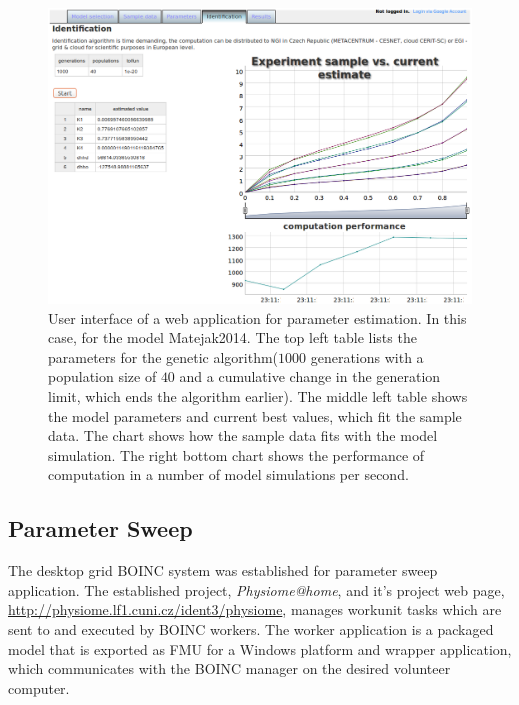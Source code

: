 \begin{figure}[htb]
    \centering
    \includegraphics[width=1\textwidth]{chapter7/app-physiovalues.png}
    \caption{User interface of a web application for parameter estimation. In this case, for the model Matejak2014\cite{Matejak2014sj}. The top left table lists the parameters for the genetic algorithm($\num{1000}$ generations with a population size of $40$ and a cumulative change in the generation limit, which ends the algorithm earlier). The middle left table shows the model parameters and current best values, which fit the sample data. The chart shows how the sample data fits with the model simulation. The right bottom chart shows the performance of computation in a number of model simulations per second.}
    \label{fig:app.physiovalues}
\end{figure}

\subsection{Parameter Sweep}
\label{sec:resultsboinc}
The desktop grid BOINC system was established for parameter sweep application. The established project, \emph{Physiome@home}, and it's project web page, \url{http://physiome.lf1.cuni.cz/ident3/physiome}, manages workunit tasks which are sent to and executed by BOINC workers. The worker application is a packaged model that is exported as FMU for a Windows platform and wrapper application, which communicates with the BOINC manager on the desired volunteer computer. 



